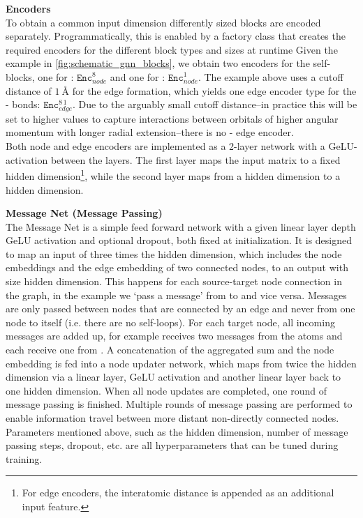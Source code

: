 \textbf{Encoders}\\
To obtain a common input dimension differently sized blocks are encoded separately. Programmatically, this is enabled by a factory class that creates the required encoders for the different block types and sizes at runtime Given the  example in \autoref{fig:schematic_gnn_blocks}, we obtain two encoders for the self-blocks, one for : $\texttt{Enc}^{8}_{node}$ and one for : $\texttt{Enc}^{1}_{node}$. The example above uses a cutoff distance of $\SI{1}{\angstrom}$ for the edge formation, which yields one edge encoder type for the - bonds: $\texttt{Enc}^{8\,1}_{edge}$. Due to the arguably small cutoff distance--in practice this will be set to higher values to capture interactions between orbitals of higher angular momentum with longer radial extension--there is no - edge encoder. \\
Both node and edge encoders are implemented as a 2-layer network with a GeLU-activation between the layers. The first layer maps the input matrix to a fixed hidden dimension\footnote{For edge encoders, the interatomic distance is appended as an additional input feature.}, while the second layer maps from a hidden dimension to a hidden dimension. 

\textbf{Message Net (Message Passing)}\\
The Message Net is a simple feed forward network with a given linear layer depth GeLU activation and optional dropout, both fixed at initialization. It is designed to map an input of three times the hidden dimension, which includes the node embeddings and the edge embedding of two connected nodes, to an output with size hidden dimension. This happens for each source-target node connection in the graph, in the example we `pass a message' from  to  and vice versa. Messages are only passed between nodes that are connected by an edge and never from one node to itself (i.e. there are no self-loops). For each target node, all incoming messages are added up, for  example  receives two messages from the  atoms and each  receive one from . A concatenation of the aggregated sum and the node embedding is fed into a node updater network, which maps from twice the hidden dimension via a linear layer, GeLU activation and another linear layer back to one hidden dimension. When all node updates are completed, one round of message passing is finished. Multiple rounds of message passing are performed to enable information travel between more distant non-directly connected nodes.\\
Parameters mentioned above, such as the hidden dimension, number of message passing steps, dropout, etc. are all hyperparameters that can be tuned during training. 

